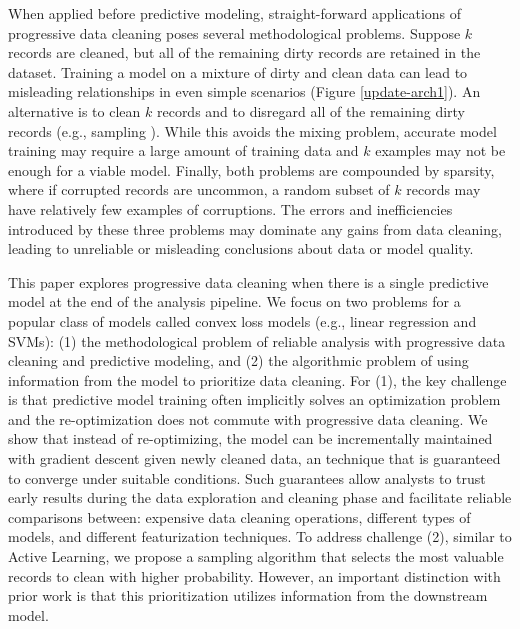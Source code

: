 When applied before predictive modeling, straight-forward applications of progressive data cleaning poses several methodological problems.
Suppose $k$ records are cleaned, but all of the remaining dirty records are retained in the dataset.
Training a model on a mixture of dirty and clean data can lead to misleading relationships in even simple scenarios (Figure \ref{update-arch1}).
An alternative is to clean $k$ records and to disregard all of the remaining dirty records (e.g., sampling \cite{wang1999sample}).
While this avoids the mixing problem, accurate model training may require a large amount of training data and $k$ examples may not be enough for a viable model.
Finally, both problems are compounded by sparsity, where if corrupted records are uncommon, a random subset of $k$ records may have relatively few examples of corruptions.
The errors and inefficiencies introduced by these three problems may dominate any gains from data cleaning, leading to unreliable or misleading conclusions about data or model quality.

This paper explores progressive data cleaning when there is a single predictive model at the end of the analysis pipeline.
We focus on two problems for a popular class of models called convex loss models (e.g., linear regression and SVMs): (1) the methodological problem of reliable analysis with progressive data cleaning and predictive modeling, and (2) the algorithmic problem of using information from the model to prioritize data cleaning.
For (1), the key challenge is that predictive model training often implicitly solves an optimization problem and the re-optimization does not commute with progressive data cleaning.
We show that instead of re-optimizing, the model can be incrementally maintained with gradient descent given newly cleaned data, an technique that is guaranteed to converge under suitable conditions.
Such guarantees allow analysts to trust early results during the data exploration and cleaning phase and facilitate reliable comparisons between: expensive data cleaning operations, different types of models, and different featurization techniques.
To address challenge (2), similar to Active Learning, we propose a sampling algorithm that selects the most valuable records to clean with higher probability.
However, an important distinction with prior work is that this prioritization utilizes information from the downstream model.

